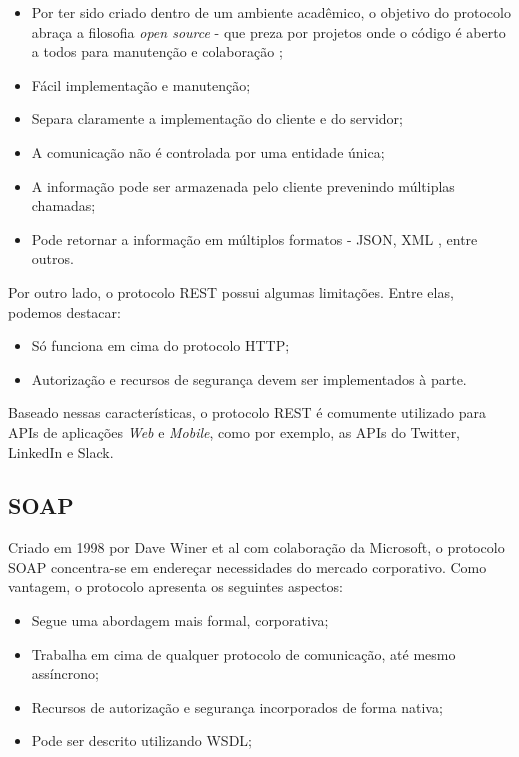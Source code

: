 \begin{itemize}
\item Por ter sido criado dentro de um ambiente acadêmico, o objetivo do protocolo abraça a filosofia \textit{open source} - que preza por projetos onde o código é aberto a todos para manutenção e colaboração \cite{weber2004success};
\item Fácil implementação e manutenção;
\item Separa claramente a implementação do cliente e do servidor;
\item A comunicação não é controlada por uma entidade única;
\item A informação pode ser armazenada pelo cliente prevenindo múltiplas chamadas;
\item Pode retornar a informação em múltiplos formatos - \ac{JSON}, \ac{XML} , entre outros.
\end{itemize}

Por outro lado, o protocolo REST possui algumas limitações. Entre elas, podemos destacar:

\begin{itemize}
	\item Só funciona em cima do protocolo HTTP;
	\item Autorização e recursos de segurança devem ser implementados à parte.
\end{itemize}

Baseado nessas características, o protocolo REST é comumente utilizado para APIs de aplicações \textit{Web} e \textit{Mobile}, como por exemplo, as APIs do Twitter, LinkedIn e Slack.

\subsection{SOAP}
Criado em 1998 por Dave Winer et al com colaboração da Microsoft, o protocolo SOAP concentra-se em endereçar necessidades do mercado corporativo. Como vantagem, o protocolo apresenta os seguintes aspectos:

\begin{itemize}
	\item Segue uma abordagem mais formal, corporativa;
	\item Trabalha em cima de qualquer protocolo de comunicação, até mesmo assíncrono;
	\item Recursos de autorização e segurança incorporados de forma nativa;
	\item Pode ser descrito utilizando \ac{WSDL};
\end{itemize}

